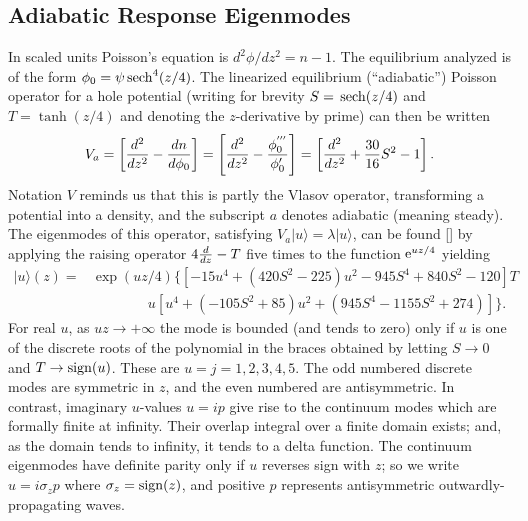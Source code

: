 \documentclass[12pt]{article}
\def\ket#1{|#1\rangle}
\def\sech{{\,\rm sech}}
\def\etothe#1{{\rm e}^{#1}}
\begin{document}
\subsection{Adiabatic Response Eigenmodes}
In scaled units Poisson's equation is $d^2\phi/dz^2=n-1$. The
equilibrium analyzed is of the form $\phi_0=\psi\sech^4(z/4)$.  The linearized
equilibrium (``adiabatic'') Poisson operator for a hole potential
(writing for brevity $S=\sech(z/4)$ and $T=\tanh(z/4)$ and denoting
the $z$-derivative by prime) can then be written
\begin{equation}
  \label{eq:1}
  V_a = \left[{d^2\over dz^2} - {dn\over d\phi_0}\right]
  = \left[{d^2\over dz^2} - {\phi_0^{'''}\over \phi_0'}\right]
  = \left[{d^2\over dz^2} +{30\over 16}S^2- 1\right].
\end{equation}
Notation $V$ reminds us that this is partly the Vlasov operator,
transforming a potential into a density, and the subscript $a$ denotes
adiabatic (meaning steady).  The eigenmodes of this
operator, satisfying $V_a\ket{u}=\lambda \ket{u}$, can be found [] by
applying the raising operator $4 {d\over dz}-T$ five times to
the function $ \etothe{uz/4}$ yielding
\begin{equation}
  \label{eq:2}
  \begin{split}
 \ket{u}(z)= &\exp(uz/4)\{[-15u^4 + (420S^2 - 225)u^2 - 945S^4 +
 840S^2 - 120]T \\
 &\qquad\qquad u[u^4 + (-105S^2 + 85)u^2 + (945S^4 - 1155S^2
 +274)]\}.
\end{split}
\end{equation}
For real $u$, as $u z\to+\infty$ the mode is bounded (and tends to
zero) only if $u$ is one of the discrete roots of the polynomial in
the braces obtained by letting $S\to 0$ and $T\to {\rm sign}(u)$. These
are $u=j=1,2,3,4,5$. The odd numbered discrete modes are symmetric in
$z$, and the even numbered are antisymmetric. In contrast, imaginary
$u$-values $u=ip$ give rise to the continuum modes which are formally
finite at infinity. Their overlap integral over a finite domain
exists; and, as the domain tends to infinity, it tends to a delta
function. The continuum eigenmodes have definite parity only if $u$
reverses sign with $z$; so we write $u=i \sigma_z p$ where
$\sigma_z={\rm sign}(z)$, and positive $p$ represents antisymmetric
outwardly-propagating waves.
\end{document}
